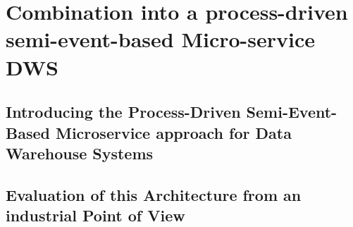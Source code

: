 \section{Combination into a process-driven semi-event-based Micro-service DWS}
\label{sec:finalArchitecture}

\subsection{Introducing the Process-Driven Semi-Event-Based Microservice approach for Data Warehouse Systems}



\subsection{Evaluation of this Architecture from an industrial Point of View}